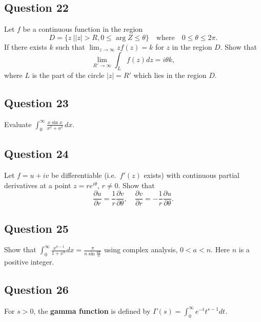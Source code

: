 \documentclass[12pt]{article}
\begin{document}
\hypertarget{question-22-2}{%
\subsection{Question 22}\label{question-22-2}}

Let \(f\) be a continuous function in the region
\[D=\{z\ |  |z|>R, 0\leq \arg Z\leq \theta\}\quad\text{where}\quad
0\leq \theta \leq 2\pi.\] If there exists \(k\) such that
\(\displaystyle{\lim_{z\to\infty} zf(z)=k}\) for \(z\) in the region
\(D\). Show that \[\lim_{R'\to\infty} \int_{L} f(z) dz=i\theta k,\]
where \(L\) is the part of the circle \(|z|=R'\) which lies in the
region \(D\).

\hypertarget{question-23-2}{%
\subsection{Question 23}\label{question-23-2}}

Evaluate
\(\displaystyle{ \int_{0}^{\infty}\frac{x\sin x}{x^2+a^2} \,dx }\).

\hypertarget{question-24-2}{%
\subsection{Question 24}\label{question-24-2}}

Let \(f=u+iv\) be differentiable (i.e.~\(f'(z)\) exists) with continuous
partial derivatives at a point \(z=re^{i\theta}\), \(r\not= 0\). Show
that
\[\frac{\partial u}{\partial r}=\frac{1}{r}\frac{\partial v}{\partial \theta},\quad
\frac{\partial v}{\partial r}=-\frac{1}{r}\frac{\partial u}{\partial \theta}.\]

\hypertarget{question-25-2}{%
\subsection{Question 25}\label{question-25-2}}

Show that
\(\displaystyle \int_0^\infty \frac{x^{a-1}}{1+x^n} dx=\frac{\pi}{n\sin \frac{a\pi}{n}}\)
using complex analysis, \(0< a < n\). Here \(n\) is a positive integer.

\hypertarget{question-26-2}{%
\subsection{Question 26}\label{question-26-2}}

For \(s>0\), the \textbf{gamma function} is defined by
\(\displaystyle{\Gamma(s)=\int_0^{\infty} e^{-t}t^{s-1} dt}\).
\end{document}
